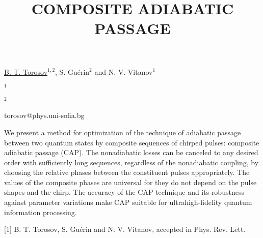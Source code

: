 \title{COMPOSITE ADIABATIC PASSAGE}

\underline{B. T. Torosov}$^{1,2}$, S. Gu\'{e}rin$^{2}$ and N. V. Vitanov$^{1}$

{\normalsize{

\vspace{-4mm} $^1$\unisofia

\vspace{-4mm} $^2$\dijon

\email torosov@phys.uni-sofia.bg}}

We present a method for optimization of the technique of adiabatic passage between two quantum states by composite sequences of chirped pulses: composite adiabatic passage (CAP). The nonadiabatic losses can be canceled to any desired order with sufficiently long sequences, regardless of the nonadiabatic coupling, by choosing the relative phases between the constituent pulses appropriately. The values of the composite phases are universal for they do not depend on the pulse shapes and the chirp. The accuracy of the CAP technique and its robustness against parameter variations make CAP suitable for ultrahigh-fidelity quantum information processing.

{\normalsize
[1] B. T. Torosov, S. Gu\'{e}rin and N. V. Vitanov, accepted in Phys. Rev. Lett.
}

\vspace{\baselineskip} 